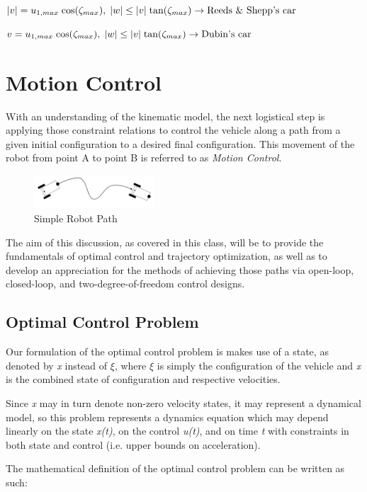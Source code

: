 \documentclass[twoside]{article}
\begin{document}
$
|v|= u_{1,max}\;\textup{cos}(\zeta_{max}),\;|w|\leq |v|\;\textup{tan}(\zeta_{max}) \rightarrow \textup{Reeds \& Shepp's car}
$

$
v= u_{1,max}\;\textup{cos}(\zeta_{max}),\;|w|\leq |v|\;\textup{tan}(\zeta_{max}) \rightarrow \textup{Dubin's car}
$

\section*{Motion Control}

With an understanding of the kinematic model, the next logistical step is applying those constraint relations to control the vehicle along a path from a given initial configuration to a desired final configuration. This movement of the robot from point A to point B is referred to as \textit{Motion Control}. 

\begin{figure}[H]
\centering
\includegraphics[width=0.4\textwidth]{MotionControl}
\caption{Simple Robot Path}
\end{figure}

The aim of this discussion, as covered in this class, will be to provide the fundamentals of optimal control and trajectory optimization, as well as to develop an appreciation for the methods of achieving those paths via open-loop, closed-loop, and two-degree-of-freedom control designs.

\subsection*{Optimal Control Problem}

Our formulation of the optimal control problem is makes use of a state,
as denoted by \textit{x} instead of $\xi$, where $\xi$ is simply the configuration of the vehicle and \textit{x} is the combined state of configuration and respective velocities.

Since \textit{x} may in turn denote non-zero velocity states, it may represent a dynamical model, so this problem represents a dynamics equation which may depend linearly on the state \textit{x(t)}, on the control \textit{u(t)}, and on time \textit{t} with constraints in both state and control (i.e. upper bounds on acceleration).

The mathematical definition of the optimal control problem can be written as such:
\end{document}

